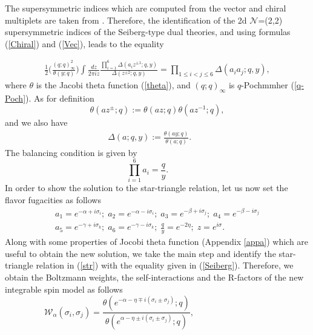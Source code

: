 \documentclass[a4paper,11pt]{article}%
\numberwithin{equation}{section}
\begin{document}
The supersymmetric indices which are computed from the vector and chiral multiplets are taken from \cite{Gadde:2013ftv}. Therefore, the identification of the  2d $\mathcal{N}$=(2,2) supersymmetric indices of the Seiberg-type dual theories, and using formulas (\ref{Chiral}) and (\ref{Vec}), leads to the equality

\begin{align}\label{Seiberg}
    \frac{1}{2}\Big(\frac{(q;q)^2_{\infty}}{\theta(y;q)}\Big) \int \frac{dz}{2\pi i z} \frac{\prod_{i=1}^6\Delta(a_iz^{\pm1};q,y)}{\Delta(z^{\pm2};q,y)}
     =\prod_{1\leq i<j\leq 6}\Delta(a_ia_j;q,y),
\end{align}
where $\theta$ is the Jacobi theta function (\ref{theta}), and $(q;q)_\infty$ is $q$-Pochmmher (\ref{q-Poch}). As for definition
\begin{equation}
 \theta(az^{\pm};q):= \theta(az;q) \theta(az^{-1};q),
\end{equation}
 and we also have 
\begin{align} \label{del}
  \Delta(a;q,y):=\frac{\theta(ay;q)}{\theta(a;q)}.\quad\,\,\,\,\,
\end{align}
The balancing condition is given by
\begin{equation}
    \prod_{i=1}^6 a_i= \frac{q}{y}.\quad\,\,\,\,\,\,\,\,
\end{equation}
In order to show the solution to the star-triangle relation, let us now set the  flavor fugacities as follows
\begin{align}
    a_1= e^{-\alpha+i\sigma_i};\; a_2= e^{-\alpha-i\sigma_i};\;a_3= e^{-\beta+i\sigma_j};\;   a_4= e^{-\beta-i\sigma_j}\\ \nonumber
     a_5= e^{-\gamma+i\sigma_k};\; a_6 = e^{-\gamma-i\sigma_k};\; \frac{q}{y}= e^{-2\eta};\;      z= e^{i\sigma}  .
\end{align}
Along with some properties of Jocobi theta function (Appendix \ref{appa}) which are useful to obtain the new solution, we take  the main step and identify  the star-triangle relation in (\ref{str}) with the equality  given in (\ref{Seiberg}). Therefore, we obtain  the Boltzmann weights, the self-interactions and the R-factors of the new integrable spin model as follows
\begin{equation}\label{B-W}
     \mathcal{W}_{\alpha}(\sigma_i,\sigma_j)=\frac{\theta( e^{-\alpha-\eta\mp i(\sigma_i\pm \sigma_j)};q)}{\theta(e^{\alpha-\eta\pm i(\sigma_i\pm \sigma_j)};q)},\qquad\qquad\qquad\qquad\,\,\,\,\,\,
\end{equation}
\end{document}
